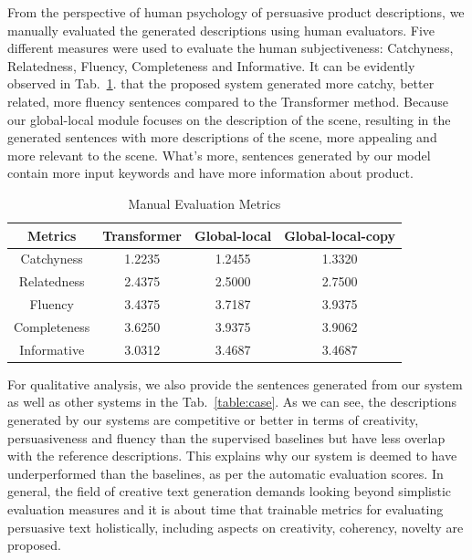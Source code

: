 \documentclass[sigconf]{acmart}
\begin{document}
From the perspective of human psychology of persuasive product descriptions, we manually evaluated the generated descriptions using human evaluators. Five different measures were used to evaluate the human subjectiveness: Catchyness, Relatedness, Fluency, Completeness and Informative. It can be evidently observed in Tab.~\ref{table:evaluation-manual}. that the proposed system generated more catchy, better related, more fluency sentences compared to the Transformer method. Because our global-local module focuses on the description of the scene, resulting in the generated sentences with more descriptions of the scene, more appealing and more relevant to the scene. What's more, sentences generated by our model contain more input keywords and have more information about product.

\begin{table}
  \caption{Manual Evaluation Metrics}
  \label{table:evaluation-manual}
  \begin{tabular}{c c c c}
    \toprule
    Metrics & Transformer & Global-local & Global-local-copy\\
    \midrule
    Catchyness & 1.2235 & 1.2455 & 1.3320\\
    Relatedness & 2.4375 & 2.5000 & 2.7500\\
    Fluency & 3.4375 & 3.7187 & 3.9375\\
    Completeness & 3.6250 & 3.9375 & 3.9062\\
    Informative & 3.0312 & 3.4687 & 3.4687 \\
  \bottomrule
\end{tabular}
\end{table}

For qualitative analysis, we also provide the sentences generated from our system as well as other systems in the Tab.~\ref{table:case}. As we can see, the descriptions generated by our systems are competitive or better in terms of creativity, persuasiveness and fluency than the supervised baselines but have less overlap with the reference descriptions. This explains why our system is deemed to have underperformed than the baselines, as per the automatic evaluation scores. In general, the field of creative text generation demands looking beyond simplistic evaluation measures and it is about time that trainable metrics for evaluating persuasive text holistically, including aspects on creativity, coherency, novelty are proposed.
\end{document}
